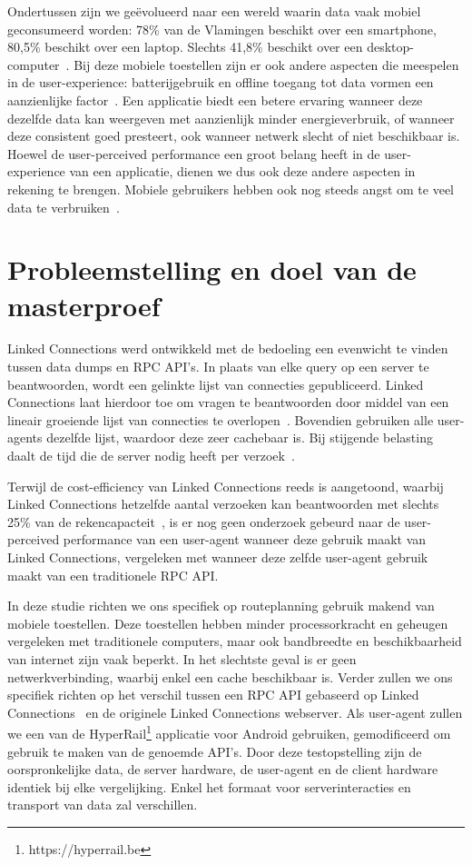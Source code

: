 Ondertussen zijn we geëvolueerd naar een wereld waarin data vaak mobiel geconsumeerd worden: 78\% van de Vlamingen beschikt over een smartphone, 80,5\% beschikt over een laptop. Slechts 41,8\% beschikt over een desktop-computer~\citep{digimeter17}. Bij deze mobiele toestellen zijn er ook andere aspecten die meespelen in de user-experience: batterijgebruik en offline toegang tot data vormen een aanzienlijke factor~\citep{ickin12}. Een applicatie biedt een betere ervaring wanneer deze dezelfde data kan weergeven met aanzienlijk minder energieverbruik, of wanneer deze consistent goed presteert, ook wanneer netwerk slecht of niet beschikbaar is. Hoewel de user-perceived performance een groot belang heeft in de user-experience van een applicatie, dienen we dus ook deze andere aspecten in rekening te brengen. Mobiele gebruikers hebben ook nog steeds angst om te veel data te verbruiken~\citep{ammelrooy17}.


\section{Probleemstelling en doel van de masterproef}
\label{sec:problem}

Linked Connections werd ontwikkeld met de bedoeling een evenwicht te vinden tussen data dumps en RPC API's. In plaats van elke query op een server te beantwoorden, wordt een gelinkte lijst van connecties gepubliceerd. Linked Connections laat hierdoor toe om vragen te beantwoorden door middel van een lineair groeiende lijst van connecties te overlopen~\citep{colpaert15}. Bovendien gebruiken alle user-agents dezelfde lijst, waardoor deze zeer cachebaar is. Bij stijgende belasting daalt de tijd die de server nodig heeft per verzoek~\citep{colpaert17}.

Terwijl de cost-efficiency van Linked Connections reeds is aangetoond, waarbij Linked Connections hetzelfde aantal verzoeken kan beantwoorden met slechts 25\% van de rekencapacteit~\citep{colpaert17,Melendez17}, is er nog geen onderzoek gebeurd naar de user-perceived performance van een user-agent wanneer deze gebruik maakt van Linked Connections, vergeleken met wanneer deze zelfde user-agent gebruik maakt van een traditionele RPC API. 

In deze studie richten we ons specifiek op routeplanning gebruik makend van mobiele toestellen. Deze toestellen hebben minder processorkracht en geheugen vergeleken met traditionele computers, maar ook bandbreedte en beschikbaarheid van internet zijn vaak beperkt. In het slechtste geval is er geen netwerkverbinding, waarbij enkel een cache beschikbaar is. Verder zullen we ons specifiek richten op het verschil tussen een RPC API gebaseerd op Linked Connections~\citep{colpaert17} en de originele Linked Connections webserver. Als user-agent zullen we een  van de HyperRail\footnote{https://hyperrail.be} applicatie voor Android gebruiken, gemodificeerd om gebruik te maken van de genoemde API's. Door deze testopstelling zijn de oorspronkelijke data, de server hardware, de user-agent en de client hardware identiek bij elke vergelijking. Enkel het formaat voor serverinteracties en transport van data zal verschillen.

